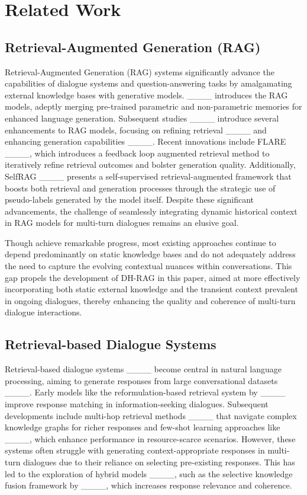 \section{Related Work}
\subsection{Retrieval-Augmented Generation (RAG)}
Retrieval-Augmented Generation (RAG) systems significantly advance the capabilities of dialogue systems and question-answering tasks by amalgamating external knowledge bases with generative models. ____ introduces the RAG models, adeptly merging pre-trained parametric and non-parametric memories for enhanced language generation. Subsequent studies ____ introduce several enhancements to RAG models, focusing on refining retrieval ____ and enhancing generation capabilities ____. Recent innovations include FLARE ____, which introduces a feedback loop augmented retrieval method to iteratively refine retrieval outcomes and bolster generation quality. Additionally, SelfRAG ____ presents a self-supervised retrieval-augmented framework that boosts both retrieval and generation processes through the strategic use of pseudo-labels generated by the model itself. Despite these significant advancements, the challenge of seamlessly integrating dynamic historical context in RAG models for multi-turn dialogues remains an elusive goal.

Though achieve remarkable progress, most existing approaches continue to depend predominantly on static knowledge bases and do not adequately address the need to capture the evolving contextual nuances within conversations. This gap propels the development of DH-RAG in this paper, aimed at more effectively incorporating both static external knowledge and the transient context prevalent in ongoing dialogues, thereby enhancing the quality and coherence of multi-turn dialogue interactions.

\subsection{Retrieval-based Dialogue Systems} 

Retrieval-based dialogue systems ____ become central in natural language processing, aiming to generate responses from large conversational datasets ____. Early models like the reformulation-based retrieval system by ____ improve response matching in information-seeking dialogues. Subsequent developments include multi-hop retrieval methods ____ that navigate complex knowledge graphs for richer responses and few-shot learning approaches like ____, which enhance performance in resource-scarce scenarios. However, these systems often struggle with generating context-appropriate responses in multi-turn dialogues due to their reliance on selecting pre-existing responses. This has led to the exploration of hybrid models ____, such as the selective knowledge fusion framework by ____, which increases response relevance and coherence.

